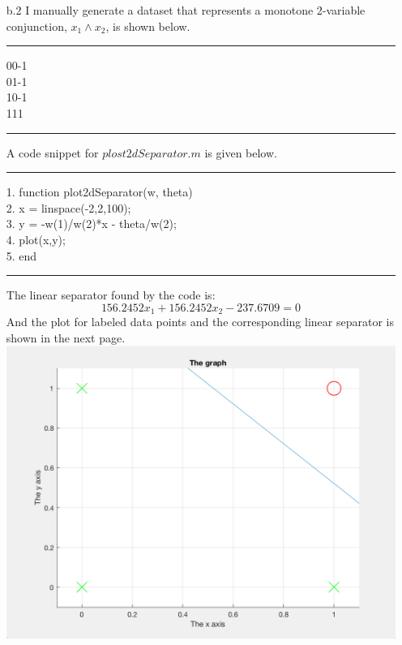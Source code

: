 \begin{enumerate}
\begin{enumerate}
	\item[b.2]
	I manually generate a dataset that represents a monotone 2-variable conjunction, $x_1 \land x_2$, is shown below.
	\begin{center}
	\noindent\rule[0.5ex]{\linewidth}{1pt}	
	0\hspace{6pt}0\hspace{8pt}-1\\
	0\hspace{6pt}1\hspace{8pt}-1\\
	1\hspace{6pt}0\hspace{8pt}-1\\
	1\hspace{6pt}1\hspace{10pt}1\\
	\noindent\rule[0.5ex]{\linewidth}{1pt}
	\end{center}
	A code snippet for $plost2dSeparator.m$ is given below. \\
	\noindent\rule[0.5ex]{\linewidth}{1pt}
	1.  function plot2dSeparator(w, theta)\\
    	2.  \qquad x = linspace(-2,2,100);\\
    	3.  \qquad y = -w(1)/w(2)*x - theta/w(2);\\
    	4.  \qquad plot(x,y);\\
	5.  end\\
	\noindent\rule[0.5ex]{\linewidth}{1pt}
	The linear separator found by the code is:
	\begin{equation*}
	156.2452x_1 + 156.2452x_2 - 237.6709 = 0
	\end{equation*}
	And the plot for labeled data points and the corresponding linear separator is shown in the next page. \\
	\includegraphics[scale = 0.7]{p3b2}

\end{enumerate}
\end{enumerate}
